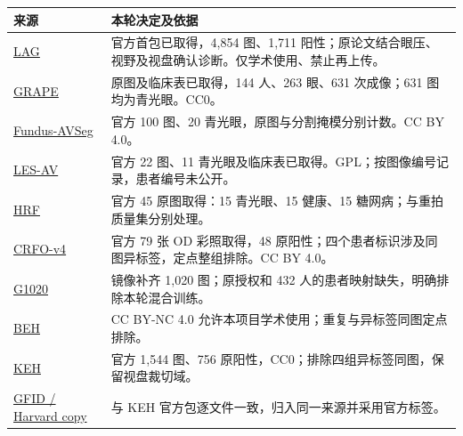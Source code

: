 \documentclass[
  10pt,
]{article}
\begin{document}
\begin{longtable}[]{@{}
  >{\raggedright\arraybackslash}p{}
  >{\raggedright\arraybackslash}p{}@{}}
\toprule\noalign{}
\begin{minipage}[b]{\linewidth}\raggedright
来源
\end{minipage} & \begin{minipage}[b]{\linewidth}\raggedright
本轮决定及依据
\end{minipage} \\
\midrule\noalign{}
\endhead
\bottomrule\noalign{}
\endlastfoot
\href{https://github.com/smilell/AG-CNN}{LAG} & 官方首包已取得，4,854
图、1,711
阳性；原论文结合眼压、视野及视盘确认诊断。仅学术使用、禁止再上传。 \\
\href{https://springernature.figshare.com/articles/dataset/GRAPE_dataset_CFPs/23575926}{GRAPE}
& 原图及临床表已取得，144 人、263 眼、631 次成像；631
图均为青光眼。CC0。 \\
\href{https://figshare.com/articles/dataset/27938034}{Fundus-AVSeg} &
官方 100 图、20 青光眼，原图与分割掩模分别计数。CC BY 4.0。 \\
\href{https://figshare.com/articles/dataset/LES-AV_dataset/11857698}{LES-AV}
& 官方 22 图、11
青光眼及临床表已取得。GPL；按图像编号记录，患者编号未公开。 \\
\href{https://www5.informatik.uni-erlangen.de/research/data/fundus-images/}{HRF}
& 官方 45 原图取得：15 青光眼、15 健康、15
糖网病；与重拍质量集分别处理。 \\
\href{https://data.mendeley.com/datasets/trghs22fpg/4}{CRFO-v4} & 官方
79 张 OD 彩照取得，48
原阳性；四个患者标识涉及同图异标签，定点整组排除。CC BY 4.0。 \\
\href{https://arxiv.org/abs/2006.09158}{G1020} & 镜像补齐 1,020
图；原授权和 432 人的患者映射缺失，明确排除本轮混合训练。 \\
\href{https://github.com/mirtanvirislam/Deep-Learning-Based-Glaucoma-Detection-with-Cropped-Optic-Cup-and-Disc-and-Blood-Vessel-Segmentation/tree/master/Dataset}{BEH}
& CC BY-NC 4.0 允许本项目学术使用；重复与异标签同图定点排除。 \\
\href{https://doi.org/10.7910/DVN/1YRRAC}{KEH} & 官方 1,544 图、756
原阳性，CC0；排除四组异标签同图，保留视盘裁切域。 \\
\href{https://zenodo.org/records/12562673}{GFID / Harvard copy} & 与 KEH
官方包逐文件一致，归入同一来源并采用官方标签。 \\

\end{longtable}
\end{document}
